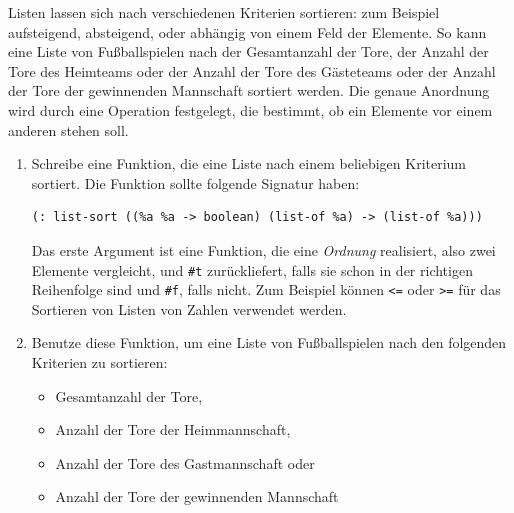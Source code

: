 \begin{aufgabe}
  Listen lassen sich nach verschiedenen Kriterien
  sortieren: zum Beispiel aufsteigend, absteigend, oder abhängig von
  einem Feld der Elemente.  So kann eine Liste von Fußballspielen nach
  der Gesamtanzahl der Tore, der Anzahl der Tore des Heimteams oder
  der Anzahl der Tore des Gästeteams oder der Anzahl der Tore der
  gewinnenden Mannschaft sortiert werden.  Die genaue Anordnung wird durch
  eine Operation festgelegt, die bestimmt, ob ein Elemente vor einem anderen
  stehen soll.

\begin{enumerate}
\item Schreibe eine Funktion, die eine Liste nach einem beliebigen
  Kriterium sortiert.  Die Funktion sollte folgende Signatur haben:

\begin{lstlisting}
(: list-sort ((%a %a -> boolean) (list-of %a) -> (list-of %a)))
\end{lstlisting}

  Das erste Argument ist eine Funktion, die eine \textit{Ordnung}
  realisiert, also zwei Elemente vergleicht, und \lstinline{#t}
  zurückliefert, falls sie schon in der richtigen Reihenfolge sind und
  \lstinline{#f}, falls nicht.  Zum Beispiel können \lstinline{<=} oder \lstinline{>=}
  für das Sortieren von Listen von Zahlen verwendet werden.
\item Benutze diese Funktion, um eine Liste von
  Fußballspielen nach den folgenden Kriterien zu sortieren:
  \begin{itemize}
  \item Gesamtanzahl der Tore,
  \item Anzahl der Tore der Heimmannschaft,
  \item Anzahl der Tore des Gastmannschaft oder
  \item Anzahl der Tore der
    gewinnenden Mannschaft
  \end{itemize}
\end{enumerate}
\end{aufgabe}

